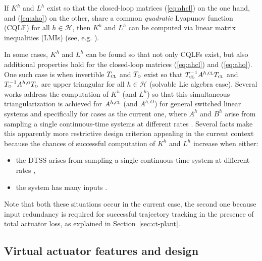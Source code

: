 \documentclass[letterpaper, 10 pt, conference]{ieeeconf}
\newcommand{\Hset}{\mathcal{H}}
\newcommand{\cl}{\textsc{cl}}
\newcommand{\ob}{\textsc{o}}
\begin{document}
If $K^h$ and $L^h$ exist so that the closed-loop matrices (\ref{eq:ahcl}) on the one hand, and (\ref{eq:aho}) on the other, share a common \emph{quadratic} Lyapunov function (CQLF) for all $h\in\Hset$, then $K^h$ and $L^h$ can be computed via linear matrix inequalities (LMIs) (see, e.g. \cite{daafouz02_stabil,sala05_vsrlmi}). 


In some cases, $K^h$ and $L^h$ can be found so that not only CQLFs
exist, but also additional properties hold for the closed-loop
matrices (\ref{eq:ahcl}) and (\ref{eq:aho}). One such case is when
invertible $T_{\cl}$ and $T_{\ob}$ exist so that $T_\cl^{-1} A^{h,\cl}
T_\cl$ and $T_\ob^{-1} A^{h,\ob} T_\ob$ are upper triangular for all
$h\in\Hset$ (solvable Lie algebra case). Several works address the
computation of $K^h$ (and $L^h$) so that this simultaneous
triangularization is achieved for $A^{h,\cl}$ (and $A^{h,O}$) for
general switched linear systems
\cite{haibra_cdc09,haibra_tac10,haimobras_2010} and specifically for
cases as the current one, where $A^h$ and $B^h$ arise from sampling a
single continuous-time systems at different rates
\cite{haimo_ifac2011,osehaimo_rpic2011,haimoose_nahs12,osehaimo_aadeca2012}. Several
facts make this apparently more restrictive design criterion appealing
in the current context because the chances of successful computation
of $K^h$ and $L^h$ increase when either:
\begin{itemize}
\item the DTSS arises from sampling a single continuous-time system at
  different rates
  \cite{haimo_ifac2011,osehaimo_rpic2011,haimoose_nahs12,osehaimo_aadeca2012},
\item the system has many inputs \cite{haibra_aucc11,haibra_rpic11,HB_TAC2013}.
\end{itemize}
Note that both these situations occur in the current case, the second
one because input redundancy is required for successful trajectory
tracking in the presence of total actuator loss, as explained in
Section~\ref{sec:ct-plant}.









\subsection{Virtual actuator features and design}
\label{sec:va-design}
\end{document}
